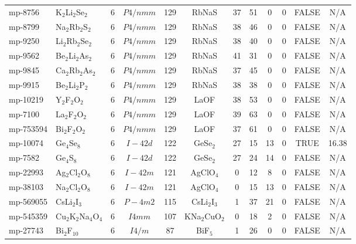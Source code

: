 {\begin{longtable}{llcccccccccc}
    mp-8756 & K$_{2}$Li$_{2}$Se$_{2}$ & 6     & $P4/nmm$ & 129   & RbNaS & 37    & 51    & 0     & 0     & FALSE & N/A \\
    mp-8799 & Na$_{2}$Rb$_{2}$S$_{2}$ & 6     & $P4/nmm$ & 129   & RbNaS & 38    & 46    & 0     & 0     & FALSE & N/A \\
    mp-9250 & Li$_{2}$Rb$_{2}$Se$_{2}$ & 6     & $P4/nmm$ & 129   & RbNaS & 38    & 40    & 0     & 0     & FALSE & N/A \\
    mp-9562 & Be$_{2}$Li$_{2}$As$_{2}$ & 6     & $P4/nmm$ & 129   & RbNaS & 41    & 31    & 0     & 0     & FALSE & N/A \\
    mp-9845 & Ca$_{2}$Rb$_{2}$As$_{2}$ & 6     & $P4/nmm$ & 129   & RbNaS & 37    & 45    & 0     & 0     & FALSE & N/A \\
    mp-9915 & Be$_{2}$Li$_{2}$P$_{2}$ & 6     & $P4/nmm$ & 129   & RbNaS & 38    & 38    & 0     & 0     & FALSE & N/A \\
    mp-10219 & Y$_{2}$F$_{2}$O$_{2}$ & 6     & $P4/nmm$ & 129   & LaOF  & 38    & 53    & 0     & 0     & FALSE & N/A \\
    mp-7100 & La$_{2}$F$_{2}$O$_{2}$ & 6     & $P4/nmm$ & 129   & LaOF  & 39    & 63    & 0     & 0     & FALSE & N/A \\
    mp-753594 & Bi$_{2}$F$_{2}$O$_{2}$ & 6     & $P4/nmm$ & 129   & LaOF  & 37    & 61    & 0     & 0     & FALSE & N/A \\
    mp-10074 & Ge$_{4}$Se$_{8}$ & 6     & $I-42d$ & 122   & GeSe$_{2}$ & 27    & 15    & 13    & 0     & TRUE  & 16.38  \\
    mp-7582 & Ge$_{4}$S$_{8}$ & 6     & $I-42d$ & 122   & GeSe$_{2}$ & 27    & 24    & 14    & 0     & FALSE & N/A \\
    mp-22993 & Ag$_{2}$Cl$_{2}$O$_{8}$ & 6     & $I-42m$ & 121   & AgClO$_{4}$ & 0     & 12    & 8     & 0     & FALSE & N/A \\
    mp-38103 & Na$_{2}$Cl$_{2}$O$_{8}$ & 6     & $I-42m$ & 121   & AgClO$_{4}$ & 0     & 15    & 13    & 0     & FALSE & N/A \\
    mp-569055 & CsLi$_{2}$I$_{3}$ & 6     & $P-4m2$ & 115   & CsLi$_{2}$I$_{3}$ & 1     & 37    & 21    & 0     & FALSE & N/A \\
    mp-545359 & Cu$_{2}$K$_{2}$Na$_{4}$O$_{4}$ & 6     & $I4mm$ & 107   & KNa$_{2}$CuO$_{2}$ & 0     & 18    & 2     & 0     & FALSE & N/A \\
    mp-27743 & Bi$_{2}$F$_{10}$ & 6     & $I4/m$ & 87    & BiF$_{5}$ & 1     & 26    & 0     & 0     & FALSE & N/A \\

\end{longtable}}
